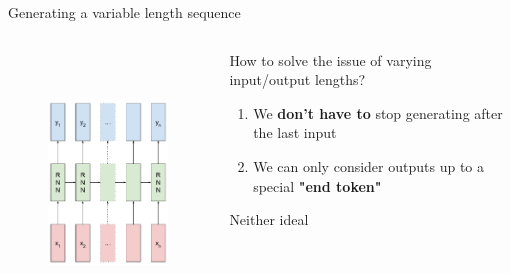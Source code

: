 \documentclass[12pt,aspectratio=169,handout]{beamer}
\begin{document}
\begin{frame}{Generating a variable length sequence}
\begin{columns}[T] %
		\begin{column}{.48\textwidth}
			\begin{figure}[h]
				\includegraphics[height=7cm]{variable_input_output.pdf}
			\end{figure}
		\end{column}

		\begin{column}{.48\textwidth}
			\pause
			\vspace{1cm}
			How to solve the issue of varying input/output lengths?
			\pause
	
			\begin{enumerate}
				\item We \textbf{don't have to} stop generating after the last input
				\item We can only consider outputs up to a special \textbf{"end token"} 
			\end{enumerate}
			\pause
			Neither ideal

		\end{column}
\end{columns}
\end{frame}
\end{document}

